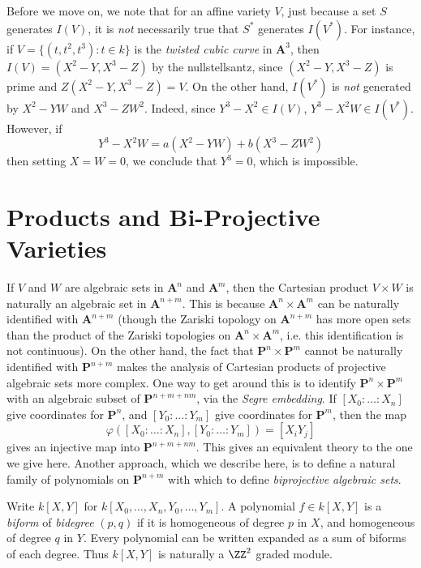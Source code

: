 Before we move on, we note that for an affine variety $V$, just because a set $S$ generates $I(V)$, it is \emph{not} necessarily true that $S^*$ generates $I(V^*)$. For instance, if $V = \{ (t,t^2,t^3): t \in k \}$ is the \emph{twisted cubic curve} in $\mathbf{A}^3$, then $I(V) = (X^2 - Y, X^3 - Z)$ by the nullstellsantz, since $(X^2 - Y, X^3 - Z)$ is prime and $Z(X^2 - Y, X^3 - Z) = V$. On the other hand, $I(V^*)$ is \emph{not} generated by $X^2 - YW$ and $X^3 - ZW^2$. Indeed, since $Y^3 - X^2 \in I(V)$, $Y^3 - X^2W \in I(V^*)$. However, if
%
\[ Y^3 - X^2W = a(X^2 - YW) + b(X^3 - ZW^2) \]
%
then setting $X = W = 0$, we conclude that $Y^3 = 0$, which is impossible.

\section{Products and Bi-Projective Varieties}

If $V$ and $W$ are algebraic sets in $\mathbf{A}^n$ and $\mathbf{A}^m$, then the Cartesian product $V \times W$ is naturally an algebraic set in $\mathbf{A}^{n+m}$. This is because $\mathbf{A}^n \times \mathbf{A}^m$ can be naturally identified with $\mathbf{A}^{n+m}$ (though the Zariski topology on $\mathbf{A}^{n+m}$ has more open sets than the product of the Zariski topologies on $\mathbf{A}^n \times \mathbf{A}^m$, i.e. this identification is not continuous). On the other hand, the fact that $\mathbf{P}^n \times \mathbf{P}^m$ cannot be naturally identified with $\mathbf{P}^{n+m}$ makes the analysis of Cartesian products of projective algebraic sets more complex. One way to get around this is to identify $\mathbf{P}^n \times \mathbf{P}^m$ with an algebraic subset of $\mathbf{P}^{n+m+nm}$, via the \emph{Segre embedding}. If $[X_0:\dots:X_n]$ give coordinates for $\mathbf{P}^n$, and $[Y_0:\dots:Y_m]$ give coordinates for $\mathbf{P}^m$, then the map
%
\[ \varphi([X_0:\dots:X_n],[Y_0:\dots:Y_m]) = [X_iY_j] \]
%
gives an injective map into $\mathbf{P}^{n+m+nm}$. This gives an equivalent theory to the one we give here. Another approach, which we describe here, is to define a natural family of polynomials on $\mathbf{P}^{n+m}$ with which to define \emph{biprojective algebraic sets}.

Write $k[X,Y]$ for $k[X_0,\dots,X_n,Y_0,\dots,Y_m]$. A polynomial $f \in k[X,Y]$ is a \emph{biform} of \emph{bidegree} $(p,q)$ if it is homogeneous of degree $p$ in $X$, and homogeneous of degree $q$ in $Y$. Every polynomial can be written expanded as a sum of biforms of each degree. Thus $k[X,Y]$ is naturally a $\ZZ^2$ graded module.

